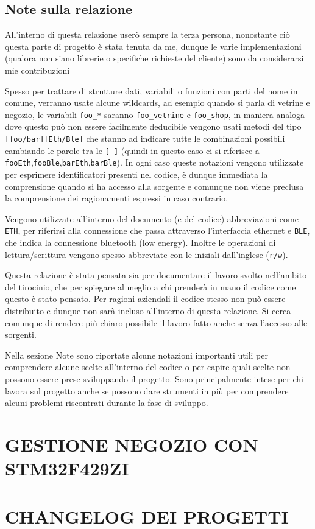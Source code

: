 \documentclass[a4paper,12pt]{article}
\begin{document}
\begin{em}

  \subsection{Note sulla relazione}

  All'interno di questa relazione user\`o sempre la terza persona, nonostante ci\`o questa parte di progetto \`e stata tenuta da me, dunque le varie implementazioni (qualora non siano librerie o specifiche richieste del cliente) sono da considerarsi mie contribuzioni

  Spesso per trattare di strutture dati, variabili o funzioni con parti del nome in comune, verranno usate alcune wildcards, ad esempio quando si parla di vetrine e negozio, le variabili \textup{\texttt{foo\_*}} saranno \textup{\texttt{foo\_vetrine}} e \textup{\texttt{foo\_shop}}, in maniera analoga dove questo pu\`o non essere facilmente deducibile vengono usati metodi del tipo \textup{\texttt{[foo/bar][Eth/Ble]}} che stanno ad indicare tutte le combinazioni possibili cambiando le parole tra le \textup{\texttt{[ ]}} (quindi in questo caso ci si riferisce a \textup{\texttt{fooEth}},\textup{\texttt{fooBle}},\textup{\texttt{barEth}},\textup{\texttt{barBle}}). In ogni caso queste notazioni vengono utilizzate per esprimere identificatori presenti nel codice, \`e dunque immediata la comprensione quando si ha accesso alla sorgente e comunque non viene preclusa la comprensione dei ragionamenti espressi in caso contrario.

  Vengono utilizzate all'interno del documento (e del codice) abbreviazioni come \textup{\texttt{ETH}}, per riferirsi alla connessione che passa attraverso l'interfaccia ethernet e \textup{\texttt{BLE}}, che indica la connessione bluetooth (low energy). Inoltre le operazioni di lettura/scrittura vengono spesso abbreviate con le iniziali dall'inglese (\textup{\texttt{r/w}}).

  Questa relazione \`e stata pensata sia per documentare il lavoro svolto nell'ambito del tirocinio, che per spiegare al meglio a chi prender\`a in mano il codice come questo \`e stato pensato. Per ragioni aziendali il codice stesso non pu\`o essere distribuito e dunque non sar\`a incluso all'interno di questa relazione. Si cerca comunque di rendere pi\`u chiaro possibile il lavoro fatto anche senza l'accesso alle sorgenti.

  Nella sezione Note sono riportate alcune notazioni importanti utili per comprendere alcune scelte all'interno del codice o per capire quali scelte non possono essere prese sviluppando il progetto. Sono principalmente intese per chi lavora sul progetto anche se possono dare strumenti in pi\`u per comprendere alcuni problemi riscontrati durante la fase di sviluppo.

\end{em}

\section{GESTIONE NEGOZIO CON STM32F429ZI}



\newpage

\section{CHANGELOG DEI PROGETTI}


\end{document}
